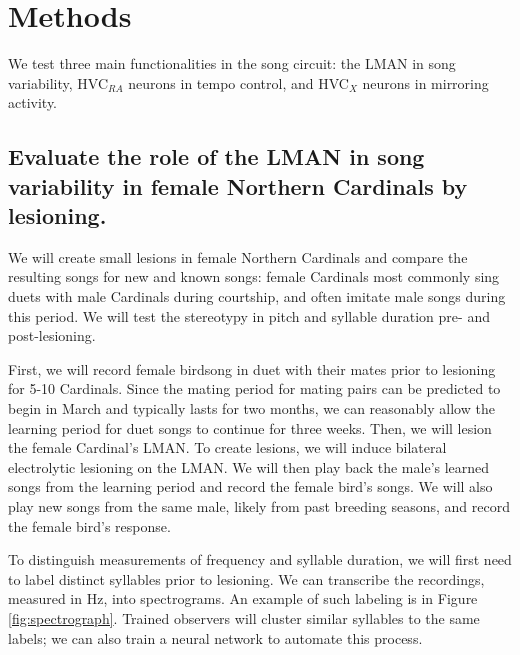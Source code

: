 \documentclass[12pt]{article}
\begin{document}


\section{Methods}

We test three main functionalities in the song circuit: the LMAN in song variability, HVC$_{RA}$ neurons in tempo control, and HVC$_X$ neurons in mirroring activity.

\subsection{Evaluate the role of the LMAN in song variability in female Northern Cardinals by lesioning.}
We will create small lesions in female Northern Cardinals and compare the resulting songs for new and known songs: female Cardinals most commonly sing duets with male Cardinals during courtship, and often imitate male songs during this period. We will test the stereotypy in pitch and syllable duration pre- and post-lesioning.

First, we will record female birdsong in duet with their mates prior to lesioning for 5-10 Cardinals. Since the mating period for mating pairs can be predicted to begin in March and typically lasts for two months, we can reasonably allow the learning period for duet songs to continue for three weeks. Then, we will lesion the female Cardinal’s LMAN. To create lesions, we will induce bilateral electrolytic lesioning on the LMAN. We will then play back the male’s learned songs from the learning period and record the female bird’s songs. We will also play new songs from the same male, likely from past breeding seasons, and record the female bird’s response.

To distinguish measurements of frequency and syllable duration, we will first need to label distinct syllables prior to lesioning. We can transcribe the recordings, measured in Hz, into spectrograms. An example of such labeling is in Figure \ref{fig:spectrograph}. Trained observers will cluster similar syllables to the same labels; we can also train a neural network to automate this process.
\end{document}
